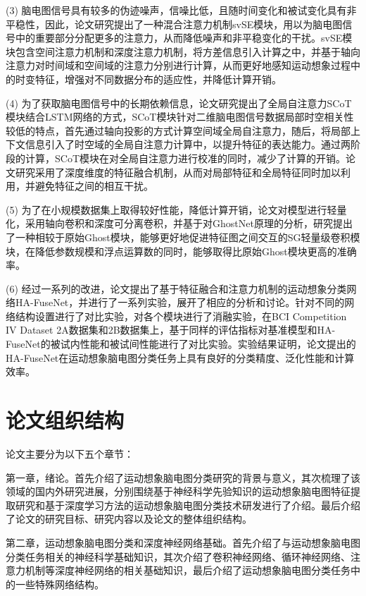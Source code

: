 (3) 脑电图信号具有较多的伪迹噪声，信噪比低，且随时间变化和被试变化具有非平稳性，因此，论文研究提出了一种混合注意力机制svSE模块，用以为脑电图信号中的重要部分分配更多的注意力，从而降低噪声和非平稳变化的干扰。svSE模块包含空间注意力机制和深度注意力机制，将方差信息引入计算之中，并基于轴向注意力对时间域和空间域的注意力分别进行计算，从而更好地感知运动想象过程中的时变特征，增强对不同数据分布的适应性，并降低计算开销。

(4) 为了获取脑电图信号中的长期依赖信息，论文研究提出了全局自注意力SCoT模块结合LSTM网络的方式，SCoT模块针对二维脑电图信号数据局部时空相关性较低的特点，首先通过轴向投影的方式计算空间域全局自注意力，随后，将局部上下文信息引入了时空域的全局自注意力计算中，以提升特征的表达能力。通过两阶段的计算，SCoT模块在对全局自注意力进行校准的同时，减少了计算的开销。论文研究采用了深度维度的特征融合机制，从而对局部特征和全局特征同时加以利用，并避免特征之间的相互干扰。

(5) 为了在小规模数据集上取得较好性能，降低计算开销，论文对模型进行轻量化，采用轴向卷积和深度可分离卷积，并基于对GhostNet原理的分析，研究提出了一种相较于原始Ghost模块，能够更好地促进特征图之间交互的SG轻量级卷积模块，在降低参数规模和浮点运算数的同时，能够取得比原始Ghost模块更高的准确率。

(6) 经过一系列的改进，论文提出了基于特征融合和注意力机制的运动想象分类网络HA-FuseNet，并进行了一系列实验，展开了相应的分析和讨论。针对不同的网络结构设置进行了对比实验，对各个模块进行了消融实验，在BCI Competition IV Dataset 2A数据集和2B数据集上，基于同样的评估指标对基准模型和HA-FuseNet的被试内性能和被试间性能进行了对比实验。实验结果证明，论文提出的HA-FuseNet在运动想象脑电图分类任务上具有良好的分类精度、泛化性能和计算效率。

\section{论文组织结构}

论文主要分为以下五个章节：

第一章，绪论。首先介绍了运动想象脑电图分类研究的背景与意义，其次梳理了该领域的国内外研究进展，分别围绕基于神经科学先验知识的运动想象脑电图特征提取研究和基于深度学习方法的运动想象脑电图分类技术研发进行了介绍。最后介绍了论文的研究目标、研究内容以及论文的整体组织结构。

第二章，运动想象脑电图分类和深度神经网络基础。首先介绍了与运动想象脑电图分类任务相关的神经科学基础知识，其次介绍了卷积神经网络、循环神经网络、注意力机制等深度神经网络的相关基础知识，最后介绍了运动想象脑电图分类任务中的一些特殊网络结构。

